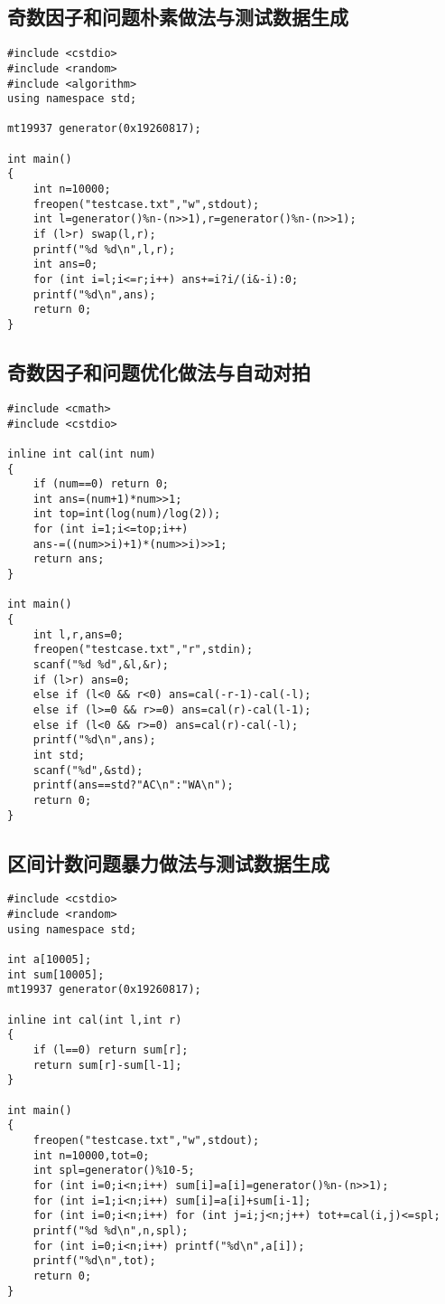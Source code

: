 \documentclass{article}
\begin{document}
\subsection{奇数因子和问题朴素做法与测试数据生成}

\begin{lstlisting}
#include <cstdio>
#include <random>
#include <algorithm>
using namespace std;

mt19937 generator(0x19260817);

int main()
{
    int n=10000;
    freopen("testcase.txt","w",stdout);
    int l=generator()%n-(n>>1),r=generator()%n-(n>>1);
    if (l>r) swap(l,r);
    printf("%d %d\n",l,r);
    int ans=0;
    for (int i=l;i<=r;i++) ans+=i?i/(i&-i):0;
    printf("%d\n",ans);
    return 0;
}
\end{lstlisting}

\subsection{奇数因子和问题优化做法与自动对拍}

\begin{lstlisting}
#include <cmath>
#include <cstdio>

inline int cal(int num)
{
    if (num==0) return 0;
    int ans=(num+1)*num>>1;
    int top=int(log(num)/log(2));
    for (int i=1;i<=top;i++)
    ans-=((num>>i)+1)*(num>>i)>>1;
    return ans;
}

int main()
{
    int l,r,ans=0;
    freopen("testcase.txt","r",stdin);
    scanf("%d %d",&l,&r);
    if (l>r) ans=0;
    else if (l<0 && r<0) ans=cal(-r-1)-cal(-l);
    else if (l>=0 && r>=0) ans=cal(r)-cal(l-1);
    else if (l<0 && r>=0) ans=cal(r)-cal(-l);
    printf("%d\n",ans);
    int std;
    scanf("%d",&std);
    printf(ans==std?"AC\n":"WA\n");
    return 0;
}
\end{lstlisting}

\subsection{区间计数问题暴力做法与测试数据生成}

\begin{lstlisting}
#include <cstdio>
#include <random>
using namespace std;

int a[10005];
int sum[10005];
mt19937 generator(0x19260817);

inline int cal(int l,int r)
{
    if (l==0) return sum[r];
    return sum[r]-sum[l-1];
}

int main()
{
    freopen("testcase.txt","w",stdout);
    int n=10000,tot=0;
    int spl=generator()%10-5;
    for (int i=0;i<n;i++) sum[i]=a[i]=generator()%n-(n>>1);
    for (int i=1;i<n;i++) sum[i]=a[i]+sum[i-1];
    for (int i=0;i<n;i++) for (int j=i;j<n;j++) tot+=cal(i,j)<=spl;
    printf("%d %d\n",n,spl);
    for (int i=0;i<n;i++) printf("%d\n",a[i]);
    printf("%d\n",tot);
    return 0;
}
\end{lstlisting}
\end{document}
